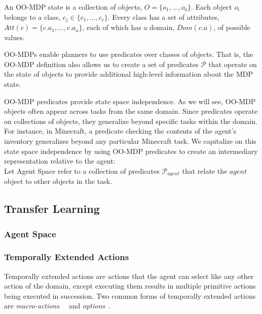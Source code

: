 \documentclass[11pt]{article}
\begin{document}
An OO-MDP state is a collection of objects, $O = \{o_1, \ldots, o_o \}$.  Each object
$o_i$ belongs to a class, $c_j \in \{c_1, \ldots, c_c\}$. Every class
has a set of attributes, $Att(c) = \{c.a_1, \ldots, c.a_a \}$, each of
which has a domain, $Dom(c.a)$, of possible values. 

OO-MDPs enable planners to use predicates over classes of objects. That is, the
OO-MDP definition also allows us to create a set of predicates $\mathcal{P}$ that
operate on the state of objects to provide additional high-level
information about the MDP state.

OO-MDP predicates provide state space independence. As we will see, OO-MDP objects
often appear across tasks from the same domain. Since predicates operate on collections
of objects, they generalize beyond specific tasks within the domain.
For instance, in Minecraft, a predicate checking the contents of the agent's inventory
generalizes beyond any particular Minecraft task. We capitalize on this state space
independence by using OO-MDP predicates to create an intermediary representation relative to the agent: \\

{ Let \textup{Agent Space} refer to a collection of predicates $\mathcal{P}_{agent}$ that relate the $agent$ object to other objects in the task}.

%
%


\subsection{Transfer Learning}

\subsubsection{Agent Space}

\subsubsection{Temporally Extended Actions}


Temporally extended actions are actions that the agent can select like
any other action of the domain, except executing them results in
multiple primitive actions being executed in succession. Two common
forms of temporally extended actions are {\em
  macro-actions}~\cite{hauskrecht98} ~and {\em
  options}~\cite{sutton99}.  
  
\end{document}
